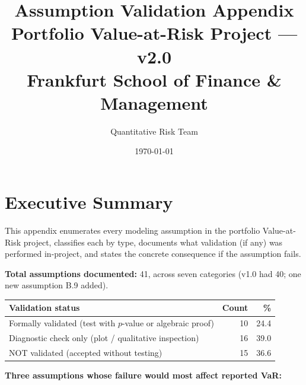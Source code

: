 \documentclass[11pt,a4paper]{article}
\title{Assumption Validation Appendix\\[0.5em]
\large Portfolio Value-at-Risk Project --- v2.0\\
\normalsize Frankfurt School of Finance \& Management}
\author{Quantitative Risk Team}
\date{\today}
\begin{document}
\maketitle
\tableofcontents
\newpage

\section{Executive Summary}\label{sec:executive-summary}

This appendix enumerates every modeling assumption in the portfolio
Value-at-Risk project, classifies each by type, documents what validation
(if any) was performed in-project, and states the concrete consequence if
the assumption fails.

\medskip
\noindent\textbf{Total assumptions documented:} 41, across seven categories
(v1.0 had 40; one new assumption B.9 added).

\medskip
\begin{tabular}{@{}lrr@{}}
\toprule
\textbf{Validation status} & \textbf{Count} & \textbf{\%} \\
\midrule
Formally validated (test with $p$-value or algebraic proof) & 10 & 24.4 \\
Diagnostic check only (plot / qualitative inspection)       & 16 & 39.0 \\
NOT validated (accepted without testing)                    & 15 & 36.6 \\
\bottomrule
\end{tabular}

\medskip
\noindent\textbf{Three assumptions whose failure would most affect reported VaR:}
\end{document}
